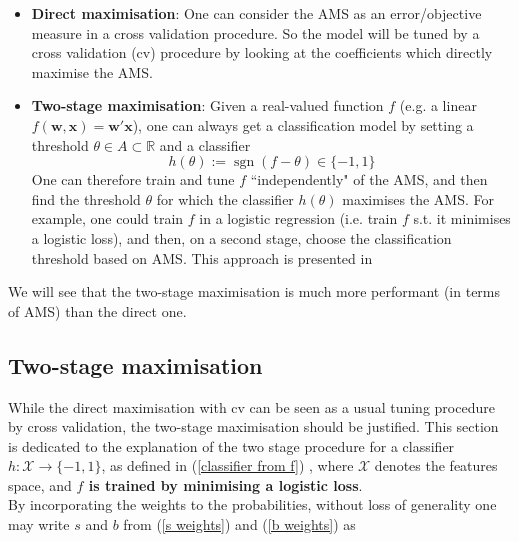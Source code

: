 \documentclass[]{article}
\begin{document}
\begin{itemize}
\item \textbf{Direct maximisation}: One can consider the AMS as an error/objective measure in a cross validation procedure. So the model will be tuned by a cross validation (cv) procedure by looking at the coefficients which directly maximise the AMS.

\item \textbf{Two-stage maximisation}: Given a real-valued function $f$ (e.g. a linear $f(\bm{w},\bm{x})=\bm{w}'\bm{x}$), one can always get a classification model by setting a threshold $\theta \in A\subset \mathbb{R}$ and a classifier
\begin{equation}
\label{classifier from f}
h(\theta):=\operatorname{sgn}(f-\theta)\in \{-1,1\}
\end{equation}
One can therefore train and tune $f$ ``independently" of the AMS, and then find the threshold $\theta$ for which the classifier $h(\theta)$ maximises the AMS. For example, one could train $f$ in a logistic regression (i.e. train $f$ s.t. it minimises a logistic loss), and then, on a second stage, choose the classification threshold based on AMS. This approach is presented in \cite{kotlowski2014consistent}
\end{itemize}
We will see that the two-stage maximisation is much more performant (in terms of AMS) than the direct one.

\subsection{Two-stage maximisation}

While the direct maximisation with cv can be seen as a usual tuning procedure by cross validation, the two-stage maximisation should be justified. This section is dedicated to the explanation of the two stage procedure for a  classifier $h:\mathcal{X}\to \{-1,1\}$, as defined in (\ref{classifier from f}) , where $\mathcal{X}$ denotes the features space, and \textbf{$f$ is trained by minimising a logistic loss}.\\

By incorporating the weights to the probabilities, without loss of generality one may write  $s$ and $b$ from (\ref{s weights}) and (\ref{b weights}) as
\end{document}
